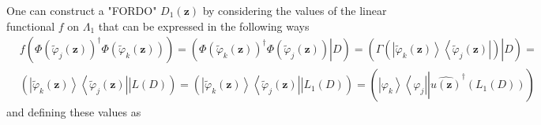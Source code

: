 \documentclass[aps,preprint]{revtex4}%
\begin{document}
One can construct a "FORDO" $D_{1}\left(  \mathbf{z}\right)  $ by considering
the values of the linear functional $f$ on $\Lambda_{1}$ that can be expressed
in the following ways
\begin{align}
&  f\left(  \Phi\left(  \tilde{\varphi}_{j}\left(  \mathbf{z}\right)  \right)
^{\dagger}\Phi\left(  \tilde{\varphi}_{k}\left(  \mathbf{z}\right)  \right)
\right)  =\left(  \left.  \Phi\left(  \tilde{\varphi}_{k}\left(
\mathbf{z}\right)  \right)  ^{\dagger}\Phi\left(  \tilde{\varphi}_{j}\left(
\mathbf{z}\right)  \right)  \right\vert D\right)  =\left(  \left.
\Gamma\left(  \left\vert \tilde{\varphi}_{k}\left(  \mathbf{z}\right)
\right\rangle \left\langle \tilde{\varphi}_{j}\left(  \mathbf{z}\right)
\right\vert \right)  \right\vert D\right)  =\nonumber\\
&  \left(  \left\vert \tilde{\varphi}_{k}\left(  \mathbf{z}\right)
\right\rangle \left\langle \tilde{\varphi}_{j}\left(  \mathbf{z}\right)
\right\vert \left\vert \overset{}{L\left(  D\right)  }\right.  \right)
=\left(  \left\vert \tilde{\varphi}_{k}\left(  \mathbf{z}\right)
\right\rangle \left\langle \tilde{\varphi}_{j}\left(  \mathbf{z}\right)
\right\vert \left\vert \overset{}{L_{1}\left(  D\right)  }\right.  \right)
=\left(  \left.  \overset{}{\left\vert \varphi_{k}\right\rangle \left\langle
\varphi_{j}\right\vert }\right\vert \widehat{u\left(  \mathbf{z}\right)
}^{\dagger}\left(  L_{1}\left(  D\right)  \right)  \right)
\end{align}
and defining these values as
\end{document}
